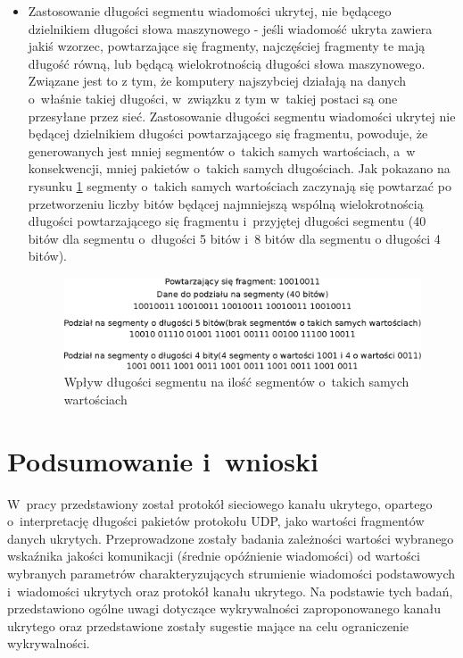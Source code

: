 \documentclass[a4paper, twoside, 12pt]{report}
\begin{document}
\begin{itemize}
           \item Zastosowanie długości segmentu wiadomości ukrytej, nie będącego
               dzielnikiem długości słowa maszynowego - jeśli wiadomość ukryta
               zawiera jakiś wzorzec, powtarzające się fragmenty, najczęściej fragmenty
               te mają długość równą, lub będącą wielokrotnością długości słowa maszynowego.
               Związane jest to z tym, że komputery najszybciej działają na danych
               o~właśnie takiej długości, w~związku z tym w~takiej postaci są one przesyłane
               przez sieć. Zastosowanie długości segmentu wiadomości ukrytej nie będącej
               dzielnikiem długości powtarzającego się fragmentu, powoduje, że generowanych
               jest mniej segmentów o~takich samych wartościach, a~w konsekwencji,
               mniej pakietów o~takich samych długościach. Jak pokazano na rysunku \ref{REPETEDFRAGMENTS}
               segmenty o~takich samych wartościach zaczynają się powtarzać po
               przetworzeniu liczby bitów będącej najmniejszą wspólną wielokrotnością
               długości powtarzającego się fragmentu i~przyjętej długości segmentu
               (40 bitów dla segmentu o~długości 5 bitów i~8 bitów dla segmentu o
               długości 4 bitów).

                \begin{figure}[h]
                        \centering
                        \includegraphics[scale=0.75]{powtorzone_fragmenty}
                        \caption{Wpływ długości segmentu na ilość segmentów o~takich samych wartościach}
                        \label{REPETEDFRAGMENTS}
                \end{figure}
       \end{itemize}


\chapter{Podsumowanie i~wnioski}
    W~pracy przedstawiony został protokół sieciowego kanału ukrytego,
    opartego o~interpretację długości pakietów protokołu UDP, jako wartości fragmentów
    danych ukrytych. Przeprowadzone zostały badania zależności wartości wybranego
    wskaźnika jakości komunikacji (średnie opóźnienie wiadomości) od wartości wybranych
    parametrów charakteryzujących strumienie wiadomości podstawowych i~wiadomości ukrytych
    oraz protokół kanału ukrytego.  Na podstawie tych badań, przedstawiono ogólne
    uwagi dotyczące wykrywalności zaproponowanego kanału ukrytego oraz przedstawione
    zostały sugestie mające na celu ograniczenie wykrywalności.
\end{document}
